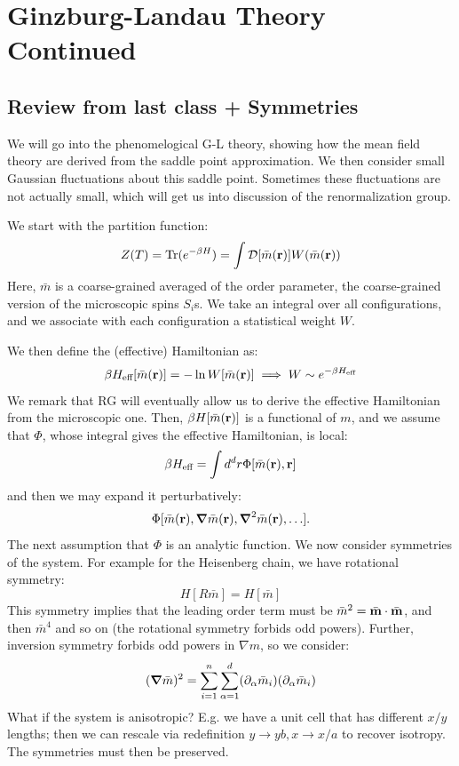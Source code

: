 \section{Ginzburg-Landau Theory Continued}
\subsection{Review from last class + Symmetries}
We will go into the phenomelogical G-L theory, showing how the mean field theory are derived from the saddle point approximation. We then consider small Gaussian fluctuations about this saddle point. Sometimes these fluctuations are not actually small, which will get us into discussion of the renormalization group.

We start with the partition function:
\begin{equation}
    Z(T) = \mathrm{Tr}(e^{-\beta H}) = \int \mathcal{D}[\bar{m}(\mathbf{r})]W(\bar{m}(\mathbf{r}))
\end{equation}
Here, $\bar{m}$ is a coarse-grained averaged of the order parameter, the coarse-grained version of the microscopic spins $S_i$s. We take an integral over all configurations, and we associate with each configuration a statistical weight $W$.

We then define the (effective) Hamiltonian as:
\begin{equation}
    \beta H_{\text{eff}}[\bar{m}(\mathbf{r})] = -\ln W[\bar{m}(\mathbf{r})] \implies W \sim e^{-\beta H_{\text{eff}}}
\end{equation}
We remark that RG will eventually allow us to derive the effective Hamiltonian from the microscopic one. Then, $\beta H[\bar{m}(\mathbf{r})]$ is a functional of $m$, and we assume that $\Phi$, whose integral gives the effective Hamiltonian, is local:
\begin{equation}
    \beta H_{\text{eff}} = \int d^dr \Phi[\bar{m}(\mathbf{r}), \mathbf{r}]
\end{equation}
and then we may expand it perturbatively:
\begin{equation}
    \Phi[\bar{m}(\v{r}), \nabla \bar{m}(\v{r}), \nabla^2 \bar{m}(\v{r}), \ldots].
\end{equation}
The next assumption that $\Phi$ is an analytic function. We now consider symmetries of the system. For example for the Heisenberg chain, we have rotational symmetry:
\begin{equation}
    H[R\bar{m}] = H[\bar{m}]
\end{equation}
This symmetry implies that the leading order term must be $\bar{m}^2 = \bar{\mathbf{m}}\cdot\bar{\mathbf{m}}$, and then $\bar{m}^4$ and so on (the rotational symmetry forbids odd powers). Further, inversion symmetry forbids odd powers in $\nabla m$, so we consider:
\begin{equation}
    (\nabla \bar{m})^2 = \sum_{i=1}^n \sum_{\alpha=1}^d (\p_\alpha \bar{m}_i)(\p_\alpha \bar{m}_i)
\end{equation}
What if the system is anisotropic? E.g. we have a unit cell that has different $x/y$ lengths; then we can rescale via redefinition $y \to yb, x \to x/a$ to recover isotropy. The symmetries must then be preserved.

